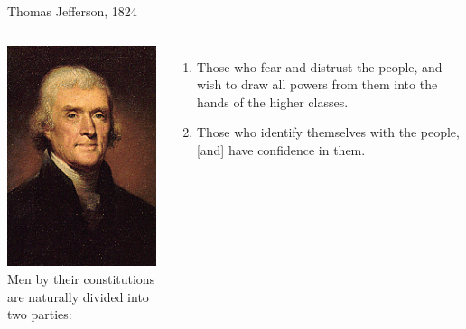 
\begin{frame}{Thomas Jefferson, 1824}
    \begin{columns}[onlytextwidth]
            \centering
            \includegraphics[height=0.75\textheight]{img/jefferson.png} \\

            Men by their constitutions are naturally divided into two parties: \\
            \begin{enumerate}
                \item Those who fear and distrust the people, and wish to draw all powers from them into the hands of the higher classes.
                \item Those who identify themselves with the people, [and] have confidence in them.
            \end{enumerate}
    \end{columns}
\end{frame}


